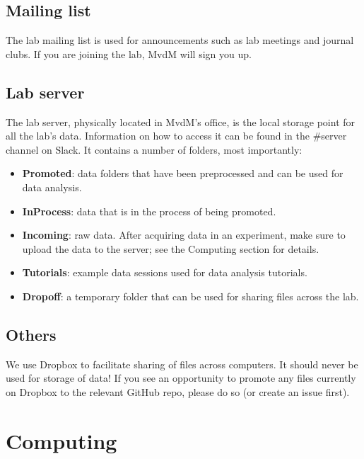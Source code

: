 \documentclass{tufte-book}
\begin{document}
\section{Mailing list}

The lab mailing list is used for announcements such as lab meetings
and journal clubs. If you are joining the lab, MvdM will sign you up.

\section{Lab server}

The lab server, physically located in MvdM's office, is the local
storage point for all the lab's data. Information on how to access it
can be found in the \#server channel on Slack. It contains a number of
folders, most importantly:

\begin{itemize}
\item{{\bf Promoted}: data folders that have been
  preprocessed and can be used for data analysis.}
\item{{\bf InProcess}: data that is in the process of being promoted.}
\item{{\bf Incoming}: raw data. After acquiring data in an experiment,
  make sure to upload the data to the server; see the Computing
  section for details.}
\item{{\bf Tutorials}: example data sessions used for data analysis
  tutorials.}
\item{{\bf Dropoff}: a temporary folder that can be used for sharing
  files across the lab.}
\end{itemize}

\section{Others}

We use Dropbox to facilitate sharing of files across computers. It
should never be used for storage of data! If you see an opportunity to
promote any files currently on Dropbox to the relevant GitHub repo,
please do so (or create an issue first).

\chapter{Computing}
\end{document}

